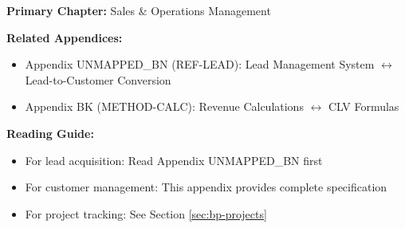 %
%

%
%
%
%

\begin{tcolorbox}[colback=purple!5!white, colframe=purple!75!black,
    title=Chapter Linkage]

\textbf{Primary Chapter:} Sales \& Operations Management

\textbf{Related Appendices:}
\begin{itemize}[nosep]
\item Appendix UNMAPPED_BN (REF-LEAD): Lead Management System $\leftrightarrow$ Lead-to-Customer Conversion
\item Appendix BK (METHOD-CALC): Revenue Calculations $\leftrightarrow$ CLV Formulas
\end{itemize}

\textbf{Reading Guide:}
\begin{itemize}[nosep]
\item For lead acquisition: Read Appendix UNMAPPED_BN first
\item For customer management: This appendix provides complete specification
\item For project tracking: See Section \ref{sec:bp-projects}
\end{itemize}

\end{tcolorbox}

